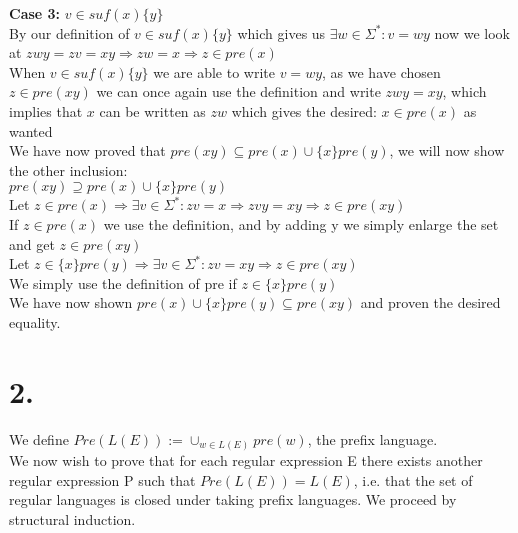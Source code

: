 \documentclass{article}
\theoremstyle{remark}
\numberwithin{equation}{section}
\begin{document}
	\textbf{Case 3:} $v \in suf(x)\{y\}$ \\
	By our definition of $v \in suf(x)\{y\}$ which gives us $\exists w \in \Sigma^* : v = wy $ now we look at $zwy = zv = xy \Rightarrow zw = x \Rightarrow z \in pre(x)$\\
	When $v \in suf(x)\{y\} $ we are able to write $v = wy$, as we have chosen $z \in pre(xy)$ we can once again use the definition and write $zwy=xy$, which implies that $x$ can be written as $zw$ which gives the desired: $x \in pre(x)$ as wanted \\
	
	We have now proved that $pre(xy) \subseteq pre(x) \cup \{x\}pre(y)$, we will now show the other inclusion:\\
	
	$pre(xy) \supseteq  pre(x) \cup \{x\}pre(y) $\\
	Let $z \in pre(x) \Rightarrow \exists v \in \Sigma^* : zv = x \Rightarrow zvy = xy \Rightarrow z \in pre(xy)$\\
	If $z \in pre(x)$  we use the definition, and by adding y we simply enlarge the set and get $z \in pre(xy)$\\
	
	Let $z \in \{x\}pre(y) \Rightarrow \exists v \in \Sigma^* : zv=xy \Rightarrow z \in pre(xy)$\\
	We simply use the definition of pre if $z \in \{x\}pre(y)$\\
	We have now shown $pre(x) \cup \{x\}pre(y) \subseteq pre(xy)$ and proven the desired equality.
	
	
	\section*{2. }
	We define $Pre(L(E)):= \cup_{w\in L(E)} pre(w)$, the prefix language.\\
	We now wish to prove that for each regular expression E there exists another regular expression P such that $Pre(L(E))=L(E)$, i.e. that the set of regular languages is closed under taking prefix languages. We proceed by structural induction. \\
	
\end{document}
